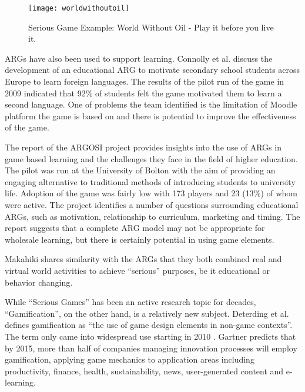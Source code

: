 \begin{figure}[ht!]
	\centering
		\texttt{[image: worldwithoutoil]}
		\caption{Serious Game Example: World Without Oil - Play it before you live it. \cite{worldwithoutoil}}
		\label{fig:worldwithoutoil}
\end{figure}

ARGs have also been used to support learning. Connolly et al. \cite{connolly2009arguing} discuss the development of an educational ARG to motivate secondary school students across Europe to learn foreign languages. The results of the pilot run of the game in 2009 indicated that 92\% of students felt the game motivated them to learn a second language. One of problems the team identified is the limitation of Moodle \cite{moodle} platform the game is based on and there is potential to improve the effectiveness of the game.

The report of the ARGOSI project \cite{whitton2009alternate} provides insights into the use of ARGs in game based learning and the challenges they face in the field of higher education. The pilot was run at the University of Bolton with the aim of providing an engaging alternative to traditional methods of introducing students to university life. Adoption of the game was fairly low with 173 players and 23 (13\%) of whom were active. The project identifies a number of questions surrounding educational ARGs, such as motivation, relationship to curriculum, marketing and timing. The report suggests that a complete ARG model may not be appropriate for wholesale learning, but there is certainly potential in using game elements.

Makahiki shares similarity with the ARGs that they both combined real and virtual world activities to achieve ``serious'' purposes, be it educational or behavior changing. 

While ``Serious Games'' has been an active research topic for decades, ``Gamification'', on the other hand, is a relatively new subject. Deterding et al. \cite {Deterding2011mt} defines gamification as ``the use of game design elements in non-game contexts''. The term only came into widespread use starting in 2010 \cite {schell2010design} \cite {zichermann2010game}. Gartner \cite {gartnerPress2011} predicts that by 2015, more than half of companies managing innovation processes will employ gamification, applying game mechanics to application areas including productivity, finance, health, sustainability, news, user-generated content and e-learning. 

